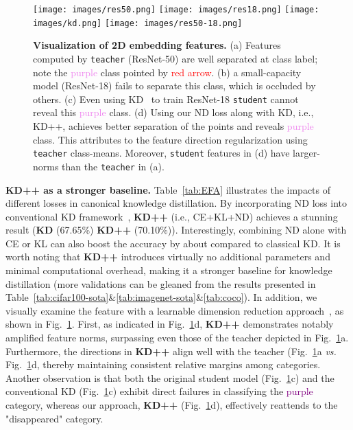 \documentclass{article}
\begin{document}
\begin{figure}[t]
\centering
    {\texttt{[image: images/res50.png]}}
    \hfill
    {\texttt{[image: images/res18.png]}}
    \hfill
    {\texttt{[image: images/kd.png]}}
    \hfill
    {\texttt{[image: images/res50-18.png]}}
\vspace{-1mm}
\caption{\small \textbf{Visualization of 2D embedding features.} 
(a) Features computed by {\tt teacher} (ResNet-50) are well separated at class label; note the \textcolor{violet}{purple} class pointed by \textcolor{red}{red arrow}.
(b) a small-capacity model (ResNet-18) fails to separate this class, which is occluded by others.
(c) Even using KD~\cite{hinton2015distilling} to train ResNet-18 {\tt student} cannot reveal this \textcolor{violet}{purple} class.
(d) Using our ND loss along with KD, i.e., KD++, achieves better separation of the points and reveals \textcolor{violet}{purple} class.
This attributes to the feature direction regularization using {\tt teacher} class-means. 
Moreover, {\tt student} features in (d) have larger-norms than the {\tt teacher} in (a).
}
\vspace{-2mm}
\label{fig:ablation-res50-18} 
\end{figure} 
\textbf{KD++ as a stronger baseline.}
Table~\ref{tab:EFA} illustrates the impacts of different losses in canonical knowledge distillation. By incorporating ND loss into conventional KD framework~\cite{hinton2015distilling}, \textbf{KD++} (i.e., CE+KL+ND)  achieves a stunning result (\textbf{KD} (67.65\%) \textbf{KD++} (70.10\%)). Interestingly, combining ND alone with CE or KL can also boost the accuracy by about  compared to classical KD. It is worth noting that \textbf{KD++} introduces virtually no additional parameters and minimal computational overhead, making it a stronger baseline for knowledge distillation (more validations can be gleaned from the results presented in Table~\ref{tab:cifar100-sota}\&\ref{tab:imagenet-sota}\&\ref{tab:coco}). In addition, we visually examine the feature with a learnable dimension reduction approach~\cite{wen2016discriminative}, as shown in Fig.~\ref{fig:ablation-res50-18}. First, as indicated in Fig.~\ref{fig:ablation-res50-18}d, \textbf{KD++} demonstrates notably amplified feature norms, surpassing even those of the teacher depicted in Fig.~\ref{fig:ablation-res50-18}a. Furthermore, the directions in \textbf{KD++} align well with the teacher (Fig.~\ref{fig:ablation-res50-18}a \textit{vs.}  Fig.~\ref{fig:ablation-res50-18}d, thereby maintaining consistent relative margins among categories. Another observation is that both the original student model (Fig.~\ref{fig:ablation-res50-18}c) and the conventional KD (Fig.~\ref{fig:ablation-res50-18}c) exhibit direct failures in classifying the \textcolor{purple}{purple} category, whereas our approach, \textbf{KD++} (Fig.~\ref{fig:ablation-res50-18}d), effectively reattends to the "disappeared" category. 
\end{document}
